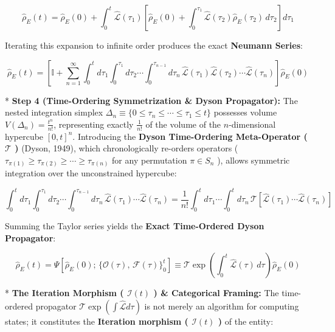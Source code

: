 \documentclass[11pt,a4paper]{article}
\theoremstyle{definition}
\theoremstyle{remark}
\begin{document}
\begin{equation}
\hat{\rho}_E(t) = \hat{\rho}_E(0) + \int_0^t \hat{\mathcal{L}}(\tau_1) [ \hat{\rho}_E(0) + \int_0^{\tau_1} \hat{\mathcal{L}}(\tau_2) \hat{\rho}_E(\tau_2) \, d\tau_2 ] d\tau_1
\end{equation}


Iterating this expansion to infinite order produces the exact \textbf{Neumann Series}:


\begin{equation}
\hat{\rho}_E(t) = [ \mathbb{I} + \sum_{n=1}^\infty \int_0^t d\tau_1 \int_0^{\tau_1} d\tau_2 \cdots \int_0^{\tau_{n-1}} d\tau_n \, \hat{\mathcal{L}}(\tau_1) \hat{\mathcal{L}}(\tau_2) \cdots \hat{\mathcal{L}}(\tau_n) ] \hat{\rho}_E(0)
\end{equation}


* \textbf{Step 4 (Time-Ordering Symmetrization \& Dyson Propagator):}
The nested integration simplex $\Delta_n \equiv \{0 \le \tau_n \le \cdots \le \tau_1 \le t\}$ possesses volume $V(\Delta_n) = \frac{t^n}{n!}$, representing exactly $\frac{1}{n!}$ of the volume of the $n$-dimensional hypercube $[0, t]^n$. Introducing the \textbf{Dyson Time-Ordering Meta-Operator ( $\mathcal{T}$ )} (Dyson, 1949), which chronologically re-orders operators ( $\tau_{\pi(1)} \ge \tau_{\pi(2)} \ge \cdots \ge \tau_{\pi(n)}$ for any permutation $\pi \in S_n$ ), allows symmetric integration over the unconstrained hypercube:


\begin{equation}
\boxed{\int_0^t d\tau_1 \int_0^{\tau_1} d\tau_2 \cdots \int_0^{\tau_{n-1}} d\tau_n \, \hat{\mathcal{L}}(\tau_1) \cdots \hat{\mathcal{L}}(\tau_n) = \frac{1}{n!} \int_0^t d\tau_1 \cdots \int_0^t d\tau_n \, \mathcal{T}[ \hat{\mathcal{L}}(\tau_1) \cdots \hat{\mathcal{L}}(\tau_n) ]}
\end{equation}


Summing the Taylor series yields the \textbf{Exact Time-Ordered Dyson Propagator}:


\begin{equation}
\boxed{\hat{\rho}_E(t) = \Psi[\hat{\rho}_E(0);\, \{\mathcal{O}(\tau),\, \mathcal{F}(\tau)\}_{0}^{t}] \equiv \mathcal{T} \exp \left( \int_0^t \hat{\mathcal{L}}(\tau) \, d\tau \right) \hat{\rho}_E(0)}
\end{equation}


* \textbf{The Iteration Morphism ( $\mathcal{I}(t)$ ) \& Categorical Framing:}
The time-ordered propagator $\mathcal{T} \exp(\int \hat{\mathcal{L}} d\tau)$ is not merely an algorithm for computing states; it constitutes the \textbf{Iteration morphism ( $\mathcal{I}(t)$ )} of the entity:
\end{document}
